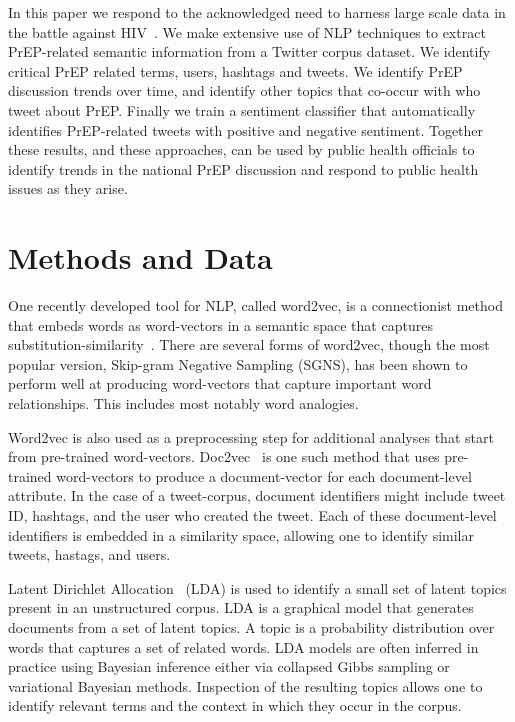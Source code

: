 \documentclass[conference]{IEEEtran}
\begin{document}
In this paper we respond to the acknowledged need to harness large scale data in the battle against HIV~\cite{young2015big}. We make extensive use of NLP techniques to extract PrEP-related semantic information from a Twitter corpus dataset. We identify critical PrEP related terms, users, hashtags and tweets. We identify PrEP discussion trends over time, and identify other topics that co-occur with who tweet about PrEP. Finally we train a sentiment classifier that automatically identifies PrEP-related tweets with positive and negative sentiment. Together these results, and these approaches, can be used by public health officials to identify trends in the national PrEP discussion and respond to public health issues as they arise.

\section{Methods and Data}

One recently developed tool for NLP, called word2vec, is a connectionist method that embeds words as word-vectors in a semantic space that captures substitution-similarity~\cite{mikolov2013efficient}. There are several forms of word2vec, though the most popular version, Skip-gram Negative Sampling (SGNS), has been shown to perform well at producing word-vectors that capture important word relationships. This includes most notably word analogies. 

Word2vec is also used as a preprocessing step for additional analyses that start from pre-trained word-vectors. Doc2vec~\cite{le2014distributed} is one such method that uses pre-trained word-vectors to produce a document-vector for each document-level attribute. In the case of a tweet-corpus, document identifiers might include tweet ID, hashtags, and the user who created the tweet. Each of these document-level identifiers is embedded in a similarity space, allowing one to identify similar tweets, hastags, and users.

Latent Dirichlet Allocation~\cite{blei2003latent} (LDA) is used to identify a small set of latent topics present in an unstructured corpus. LDA is a graphical model that generates documents from a set of latent topics. A topic is a probability distribution over words that captures a set of related words. LDA models are often inferred in practice using Bayesian inference either via collapsed Gibbs sampling or variational Bayesian methods. Inspection of the resulting topics allows one to identify relevant terms and the context in which they occur in the corpus. 
\end{document}
